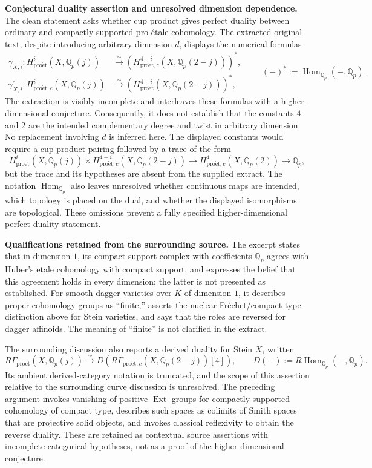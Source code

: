 \documentclass[11pt]{article}
\newcommand{\Q}{\mathbb{Q}}
\begin{document}
\textbf{Conjectural duality assertion and unresolved dimension dependence.} The clean statement asks whether cup product gives perfect duality between ordinary and compactly supported pro-\'etale cohomology. The extracted original text, despite introducing arbitrary dimension \(d\), displays the numerical formulas
\[
\begin{aligned}
\gamma_{X,i}:H^i_{\mathrm{pro\acute et}}(X,\Q_p(j))
&\xrightarrow{\sim}
\left(H^{4-i}_{\mathrm{pro\acute et},c}(X,\Q_p(2-j))\right)^*,\\
\gamma^c_{X,i}:H^i_{\mathrm{pro\acute et},c}(X,\Q_p(j))
&\xrightarrow{\sim}
\left(H^{4-i}_{\mathrm{pro\acute et}}(X,\Q_p(2-j))\right)^*,
\end{aligned}
\qquad
(-)^*:=\operatorname{Hom}_{\Q_p}(-,\Q_p).
\]
The extraction is visibly incomplete and interleaves these formulas with a higher-dimensional conjecture. Consequently, it does not establish that the constants \(4\) and \(2\) are the intended complementary degree and twist in arbitrary dimension. No replacement involving \(d\) is inferred here. The displayed constants would require a cup-product pairing followed by a trace of the form
\[
H^i_{\mathrm{pro\acute et}}(X,\Q_p(j))
\times H^{4-i}_{\mathrm{pro\acute et},c}(X,\Q_p(2-j))
\longrightarrow H^4_{\mathrm{pro\acute et},c}(X,\Q_p(2))
\longrightarrow\Q_p,
\]
but the trace and its hypotheses are absent from the supplied extract. The notation \(\operatorname{Hom}_{\Q_p}\) also leaves unresolved whether continuous maps are intended, which topology is placed on the dual, and whether the displayed isomorphisms are topological. These omissions prevent a fully specified higher-dimensional perfect-duality statement.

\textbf{Qualifications retained from the surrounding source.} The excerpt states that in dimension \(1\), its compact-support complex with coefficients \(\Q_p\) agrees with Huber's \’etale cohomology with compact support, and expresses the belief that this agreement holds in every dimension; the latter is not presented as established. For smooth dagger varieties over \(K\) of dimension \(1\), it describes proper cohomology groups as ``finite,'' asserts the nuclear Fr\'echet/compact-type distinction above for Stein varieties, and says that the roles are reversed for dagger affinoids. The meaning of ``finite'' is not clarified in the extract.

The surrounding discussion also reports a derived duality for Stein \(X\), written
\[
R\Gamma_{\mathrm{pro\acute et}}(X,\Q_p(j))
\xrightarrow{\sim}
D\!\left(R\Gamma_{\mathrm{pro\acute et},c}(X,\Q_p(2-j))[4]\right),
\qquad D(-):=R\operatorname{Hom}_{\Q_p}(-,\Q_p).
\]
Its ambient derived-category notation is truncated, and the scope of this assertion relative to the surrounding curve discussion is unresolved. The preceding argument invokes vanishing of positive \(\operatorname{Ext}\) groups for compactly supported cohomology of compact type, describes such spaces as colimits of Smith spaces that are projective solid objects, and invokes classical reflexivity to obtain the reverse duality. These are retained as contextual source assertions with incomplete categorical hypotheses, not as a proof of the higher-dimensional conjecture.
\end{document}
